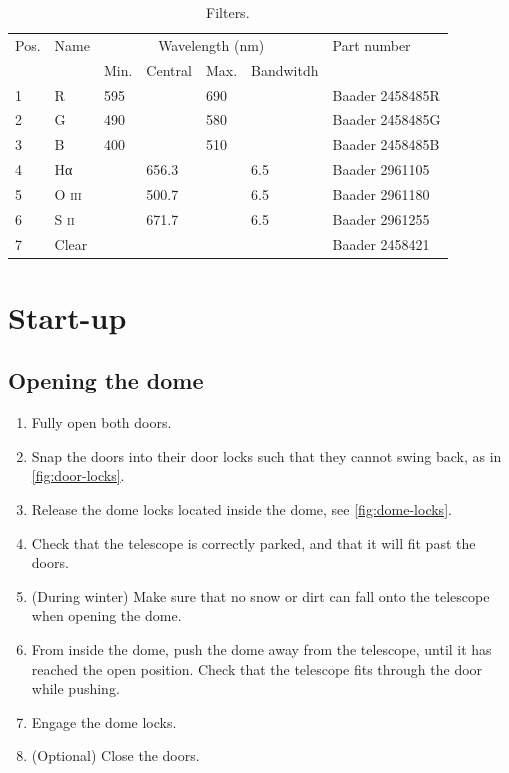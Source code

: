 \documentclass[a4paper, 11pt, fleqn]{memoir}
\begin{document}
\begin{table}
    \centering
    \begin{tabular}{lllllll}
        \toprule
        Pos. & Name & \multicolumn{4}{c}{Wavelength (nm)} & Part number\\
        \cmidrule(lr){3-6}
        & & Min. & Central & Max. & Bandwitdh & \\
        \midrule
        1 & R & 595 & & 690 & & Baader 2458485R\\
        2 & G & 490 & & 580 & & Baader 2458485G\\
        3 & B & 400 & & 510 & & Baader 2458485B\\
        4 & Hα & & 656.3 & & 6.5 & Baader 2961105\\
        5 & O \textsc{iii} & & 500.7 & & 6.5 & Baader 2961180\\
        6 & S \textsc{ii} & & 671.7 & & 6.5 & Baader 2961255\\
        7 & Clear & & & & & Baader 2458421\\
        \bottomrule
    \end{tabular}
    \caption{Filters.}
    \label{tab:filters}
\end{table}

\clearpage

\section{Start-up}

\subsection{Opening the dome}

\begin{enumerate}
    \item Fully open both doors.
    \item Snap the doors into their door locks such that they cannot swing back, as in \cref{fig:door-locks}.
    \item Release the dome locks located inside the dome, see \cref{fig:dome-locks}.
    \item Check that the telescope is correctly parked, and that it will fit past the doors.
    \item (During winter) Make sure that no snow or dirt can fall onto the telescope when opening the dome.
    \item From inside the dome, push the dome away from the telescope, until it has reached the open position.
          Check that the telescope fits through the door while pushing.
    \item Engage the dome locks.
    \item (Optional) Close the doors.
\end{enumerate}
\end{document}
